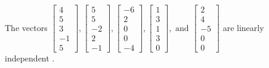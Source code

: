 \begin{exercise}
\begin{exerciseStatement}
  \end{exerciseStatement}
  \begin{exerciseAnswer}
   The vectors \(\left[\begin{array}{r}
4 \\
5 \\
3 \\
-1 \\
5
\end{array}\right] , \left[\begin{array}{r}
5 \\
5 \\
-2 \\
2 \\
-1
\end{array}\right] , \left[\begin{array}{r}
-6 \\
2 \\
0 \\
0 \\
-4
\end{array}\right] , \left[\begin{array}{r}
1 \\
3 \\
1 \\
3 \\
0
\end{array}\right] , \text{ and } \left[\begin{array}{r}
2 \\
4 \\
-5 \\
0 \\
0
\end{array}\right]\) are 
  	 linearly independent  .
  


  \end{exerciseAnswer}
\end{exercise}